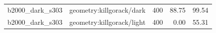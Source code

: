 \begin{longtable}{l>{\raggedright\arraybackslash}p{.42\linewidth}rrr}
b2000\_\allowbreak{}dark\_\allowbreak{}s303 & %
geometry:killgorack/dark & %
400 & %
88.75 & %
99.54 \\ %

b2000\_\allowbreak{}dark\_\allowbreak{}s303 & %
geometry:killgorack/light & %
400 & %
0.00 & %
55.31 \\ %


\end{longtable}
